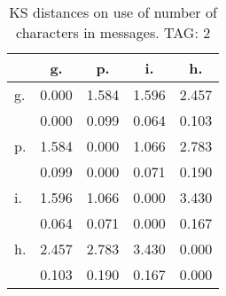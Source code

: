 \begin{table}[h!]
\begin{center}
\begin{tabular}{| l | c | c | c | c |}\hline
 & g. & p. & i. & h. \\\hline
g. & 0.000  & 1.584  & 1.596  & 2.457 \\\hline
 & 0.000  & 0.099  & 0.064  & 0.103 \\\hline
p. & 1.584  & 0.000  & 1.066  & 2.783 \\\hline
 & 0.099  & 0.000  & 0.071  & 0.190 \\\hline
i. & 1.596  & 1.066  & 0.000  & 3.430 \\\hline
 & 0.064  & 0.071  & 0.000  & 0.167 \\\hline
h. & 2.457  & 2.783  & 3.430  & 0.000 \\\hline
 & 0.103  & 0.190  & 0.167  & 0.000 \\\hline
\end{tabular}
\caption{KS distances on use of number of characters in messages. TAG: 2}
\end{center}
\end{table}